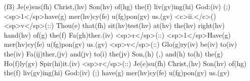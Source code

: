 (f3) Je(e)sus(fh) Christ,(hv) Son(hv) of(hg) the(f) liv(gv)ing(hi) God:(iv) (;) <sp>1</sp>have(g) mer(hv)cy(fe) u(fg)pon(gv) us.(gv) <c>ii.</c>() <sp>v</sp>(::) Thou(e) that(fh) sit(hv)test(hv) at(hv) the(hv) right(hv) hand(hv) of(g) the(f) Fa(gh)ther.(iv) <sp>r</sp>(::) <sp>1</sp>Have(g) mer(hv)cy(fe) u(fg)pon(gv) us.(gv) <sp>v</sp>(::) Glo(g)ry(iv) be(iv) to(iv) the(iv) Fa(ij)ther,(jv) and(jv) to(i) the(jv) Son,(h) (,) and(h) to(h) the(g) Ho(f)ly(gv) Spir(hi)it.(iv) <sp>r</sp>(::) Je(e)su(fh) Christ,(hv) Son(hv) of(hg) the(f) liv(gv)ing(hi) God:(iv) (;) have(g) mer(hv)cy(fe) u(fg)pon(gv) us.(gv)